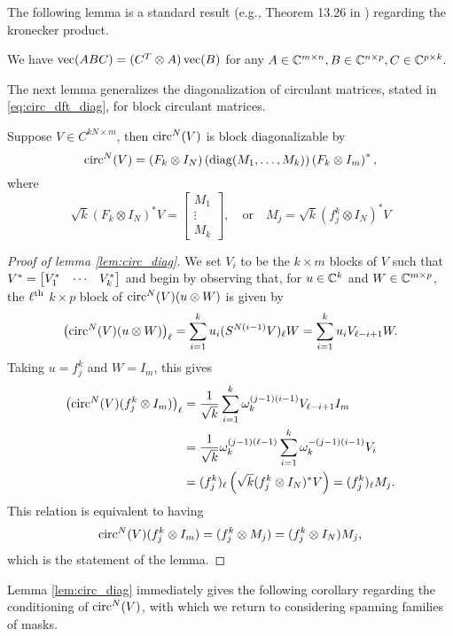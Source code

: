 The following lemma is a standard result (e.g., Theorem 13.26 in \cite{laub2004matrix}) regarding the kronecker product.

\begin{lemma}
  We have $\operatorname{vec}(A B C) = (C^T \otimes A) \operatorname{vec}(B)$ for any $A \in \mathbb{C}^{m \times n}, B \in \mathbb{C}^{n \times p}, C \in \mathbb{C}^{p \times k}.$
  \label{lem:kronvec}
\end{lemma}
The next lemma generalizes the diagonalization of circulant matrices, stated in \eqref{eq:circ_dft_diag}, for block circulant matrices.

\begin{lemma}
  Suppose $V \in C^{k N \times m}$, then $\operatorname{circ}^N(V)$ is block diagonalizable by \[\operatorname{circ}^N(V) = \left(F_k \otimes I_N\right) \left(\operatorname{diag}(M_1, \ldots, M_k)\right) \left(F_k \otimes I_m\right)^*,\] where \[\sqrt{k}\left(F_k \otimes I_N\right)^* V = \begin{bmatrix} M_1 \\ \vdots \\ M_k \end{bmatrix}, \quad \text{or} \quad M_j = \sqrt{k} (f_j^k \otimes I_N)^* V\] \label{lem:circ_diag}
\end{lemma}

\begin{proof}[Proof of lemma \ref{lem:circ_diag}]
  We set $V_i$ to be the $k \times m$ blocks of $V$ such that $V^* = \begin{bmatrix} V^*_{1} & \cdots & V^*_{k} \end{bmatrix}$ and begin by observing that, for $u \in \mathbb{C}^k$ and $W \in \mathbb{C}^{m \times p}$, the $\ell^{\text{th}}$ $k \times p$ block of $\operatorname{circ}^N(V)(u \otimes W)$ is given by \[\left(\operatorname{circ}^N(V)(u \otimes W)\right)_\ell = \sum_{i = 1}^k u_i (S^{N (i - 1)}V)_\ell W = \sum_{i = 1}^k u_i V_{\ell - i + 1} W.\]  Taking $u = f_j^k$ and $W = I_m$, this gives \begin{align*} \left(\operatorname{circ}^N(V)(f_j^k \otimes I_m)\right)_\ell &= \frac{1}{\sqrt{k}}\sum_{i = 1}^k \omega_k^{(j - 1) (i - 1)} V_{\ell - i + 1} I_m \\ &= \frac{1}{\sqrt{k}} \omega_k^{(j - 1) (\ell - 1)} \sum_{i = 1}^k \omega_k^{-(j - 1)(i - 1)} V_i \\ &= (f_j^k)_\ell \left(\sqrt{k} (f_j^k \otimes I_N)^* V \right) = (f_j^k)_\ell M_j. \end{align*}  This relation is equivalent to having \[\operatorname{circ}^N(V) (f_j^k \otimes I_m) = (f_j^k \otimes M_j) = (f_j^k \otimes I_N) M_j,\] which is the statement of the lemma.
\end{proof}

Lemma \ref{lem:circ_diag} immediately gives the following corollary regarding the conditioning of $\operatorname{circ}^N(V)$, with which we return to considering spanning families of masks.

